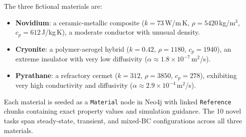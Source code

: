 \documentclass[preprint,review,12pt]{elsarticle}
\begin{document}
The three fictional materials are:
\begin{itemize}
  \item \textbf{Novidium}: a ceramic-metallic composite ($k{=}73$\,W/m\,K,
        $\rho{=}5420$\,kg/m$^3$, $c_p{=}612$\,J/kg\,K),
        a moderate conductor with unusual density.
  \item \textbf{Cryonite}: a polymer-aerogel hybrid ($k{=}0.42$,
        $\rho{=}1180$, $c_p{=}1940$), an extreme insulator with
        very low diffusivity ($\alpha \approx 1.8{\times}10^{-7}$\,m$^2$/s).
  \item \textbf{Pyrathane}: a refractory cermet ($k{=}312$,
        $\rho{=}3850$, $c_p{=}278$), exhibiting very high conductivity
        and diffusivity ($\alpha \approx 2.9{\times}10^{-4}$\,m$^2$/s).
\end{itemize}
Each material is seeded as a \texttt{Material} node in Neo4j with linked
\texttt{Reference} chunks containing exact property values and
simulation guidance.  The 10 novel tasks span steady-state, transient,
and mixed-BC configurations across all three materials.
\end{document}
